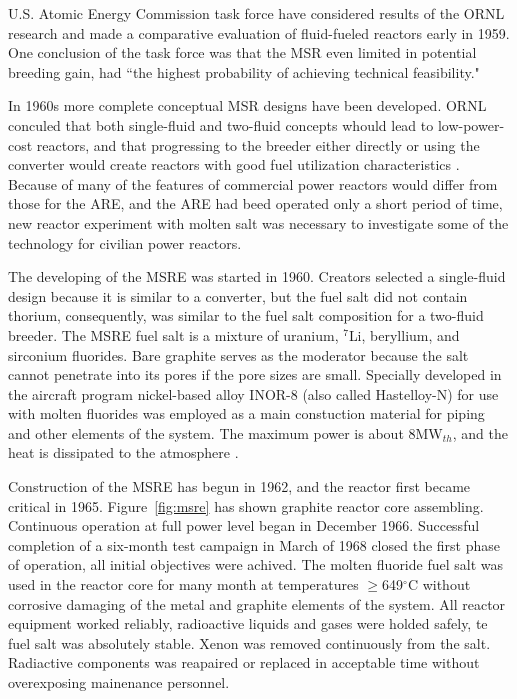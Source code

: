 U.S. Atomic Energy Commission task force have considered results of the \gls{ORNL} research and made a comparative evaluation of fluid-fueled reactors early in 1959. One conclusion of the task force was that the \gls{MSR} even limited in potential breeding gain, had ``the highest probability of achieving technical feasibility." \cite{noauthor_report_1959}

In 1960s more complete conceptual \gls{MSR} designs have been developed. \gls{ORNL} conculed that both single-fluid and two-fluid concepts whould lead to low-power-cost reactors, and that progressing to the breeder either directly or using the converter would create reactors with good fuel utilization characteristics \cite{rosenthal_molten-salt_1970}. Because of many of the features of commercial power reactors would differ from those for the \gls{ARE}, and the \gls{ARE} had beed operated only a short period of time, new reactor experiment with molten salt was necessary to investigate some of the technology for civilian power reactors.

The developing of the \gls{MSRE} was started in 1960. Creators selected a single-fluid design because it is similar to a converter, but the fuel salt did not contain thorium, consequently, was similar to the fuel salt composition for a two-fluid breeder. The \gls{MSRE} fuel salt is a mixture of uranium, $^7$Li, beryllium, and sirconium fluorides. Bare graphite serves as the moderator because the salt cannot penetrate into its pores if the pore sizes are small. Specially developed in the aircraft program nickel-based alloy INOR-8 (also called Hastelloy-N) for use with molten fluorides was employed as a main constuction material for piping and other elements of the system. The maximum power is about 8MW$_{th}$, and the heat is dissipated to the atmosphere \cite{haubenreich_experience_1970}.

Construction of the \gls{MSRE} has begun in 1962, and the reactor first became critical in 1965. Figure~\ref{fig:msre} has shown graphite reactor core assembling. Continuous operation at full power level began in December 1966. Successful completion of a six-month test campaign in March of 1968 closed the first phase of operation, all initial objectives were achived. The molten fluoride fuel salt was used in the reactor core for many month at temperatures $\geq$649$^{\circ}$C without corrosive damaging of the metal and graphite elements of the system. All reactor equipment worked reliably, radioactive liquids and gases were holded safely, te fuel salt was absolutely stable. Xenon was removed continuously from the salt. Radiactive components was reapaired or replaced in acceptable time without overexposing mainenance personnel.


